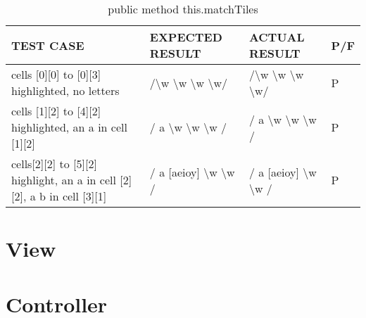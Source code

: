 \documentclass[11pt, oneside]{report}
\begin{document}
\begin{table}[H]
\caption{public method this.matchTiles}
\begin{center}
\begin{tabular}{|p{}|p{}|p{}|p{}|}

\hline
\textbf{TEST CASE} & \textbf{EXPECTED RESULT} & \textbf{ACTUAL RESULT} & P/F \\
\hline
cells [0][0] to [0][3] highlighted, no letters & /\textbackslash w \textbackslash w \textbackslash w \textbackslash w/ & /\textbackslash w \textbackslash w \textbackslash w \textbackslash w/ & P \\
\hline
cells [1][2] to [4][2] highlighted, an a in cell [1][2] & / a \textbackslash w \textbackslash w \textbackslash w / & / a \textbackslash w \textbackslash w \textbackslash w / & P \\
\hline
cells[2][2] to [5][2] highlight, an a in cell [2][2], a b in cell [3][1] & / a [aeioy] \textbackslash w \textbackslash w / & / a [aeioy] \textbackslash w \textbackslash w / & P \\
\hline
\end{tabular}
\end{center}
\label{default}
\end{table}%

\section{View}





\section{Controller}


\end{document}
